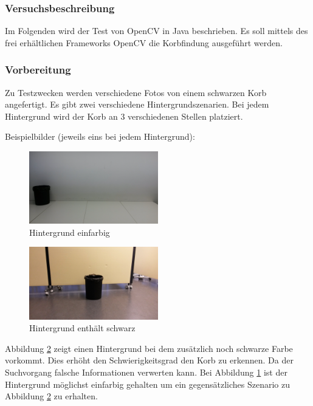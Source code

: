\subsubsection{Versuchsbeschreibung}
Im Folgenden wird der Test von OpenCV in Java beschrieben. Es soll mittels des 
frei erhältlichen Frameworks OpenCV die Korbfindung ausgeführt werden.

\subsubsection{Vorbereitung}
Zu Testzwecken werden verschiedene Fotos von einem schwarzen Korb angefertigt. 
Es gibt zwei verschiedene Hintergrundszenarien. Bei jedem Hintergrund wird der 
Korb an 3 verschiedenen Stellen platziert.

Beispielbilder (jeweils eins bei jedem Hintergrund):

\begin{figure}[h!]
    \centering
    \includegraphics[width=0.5\textwidth]{fig/korb4.jpg}
    \caption{Hintergrund einfarbig}
    \label{fig:Korb_HEinfarbig}
\end{figure}

\begin{figure}[h!]
    \centering
    \includegraphics[width=0.5\textwidth]{fig/korb1.jpg}
    \caption{Hintergrund enthält schwarz}
    \label{fig:Korb_HSchwarz}
\end{figure}

Abbildung \ref{fig:Korb_HSchwarz} zeigt einen Hintergrund bei dem zusätzlich 
noch schwarze Farbe vorkommt. Dies erhöht den Schwierigkeitsgrad  den Korb zu 
erkennen. Da der Suchvorgang falsche Informationen verwerten kann. Bei 
Abbildung \ref{fig:Korb_HEinfarbig} ist der Hintergrund möglichst einfarbig 
gehalten um ein gegensätzliches Szenario zu Abbildung \ref{fig:Korb_HSchwarz} 
zu erhalten.

